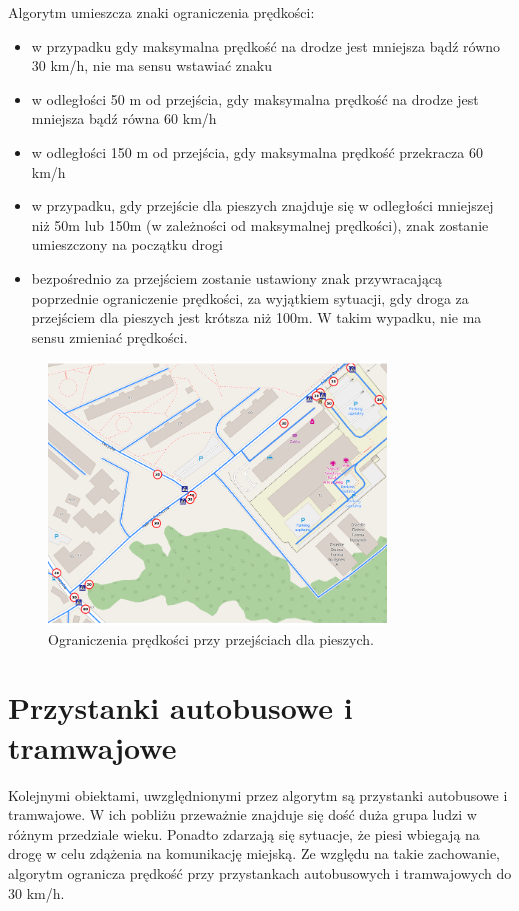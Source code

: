 Algorytm umieszcza znaki ograniczenia prędkości:
\begin{itemize}
\item w przypadku gdy maksymalna prędkość na drodze jest mniejsza bądź równo 30 km/h, nie ma sensu wstawiać znaku
\item w odległości 50 m od przejścia, gdy maksymalna prędkość na drodze jest mniejsza bądź równa 60 km/h
\item w odległości 150 m od przejścia, gdy maksymalna prędkość przekracza 60 km/h
\item w przypadku, gdy przejście dla pieszych znajduje się w odległości mniejszej niż 50m lub 150m (w zależności od maksymalnej prędkości), znak zostanie umieszczony na początku drogi
\item bezpośrednio za przejściem zostanie ustawiony znak przywracającą poprzednie ograniczenie prędkości, za wyjątkiem sytuacji, gdy droga za przejściem dla pieszych jest krótsza niż 100m. W takim wypadku, nie ma sensu zmieniać prędkości.
\end{itemize}

\begin{figure}[h]
\caption{Ograniczenia prędkości przy przejściach dla pieszych.}
\label{sec:przejsciePredkosci}
\centering
\includegraphics[width=0.8\textwidth]{pedestrian_speed}
\end{figure}

\newpage
\section{Przystanki autobusowe i tramwajowe}
\label{sec:busStopsMain}
Kolejnymi obiektami, uwzględnionymi przez algorytm są przystanki autobusowe i tramwajowe. W ich pobliżu przeważnie znajduje się dość duża grupa ludzi w różnym przedziale wieku. Ponadto zdarzają się sytuacje, że piesi wbiegają na drogę w celu zdążenia na komunikację miejską. Ze względu na takie zachowanie, algorytm ogranicza prędkość przy przystankach autobusowych i tramwajowych do 30 km/h.

